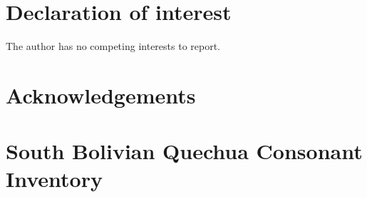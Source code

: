 \documentclass[a4paper,man,floatsintext,natbib,donotrepeattitle, apacite]{apa6}
\begin{document}
\section*{Declaration of interest}
The author has no competing interests to report. 

\section*{Acknowledgements}


\theendnotes



\appendix
\section{South Bolivian Quechua Consonant Inventory}\label{app:app-A}
\end{document}
